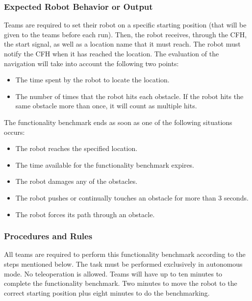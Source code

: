 \subsubsection{Expected Robot Behavior or Output}
\label{sssec:FooOMOutput}

Teams are required to set their robot on a specific starting position (that will be given to the teams before each run). Then, the robot receives, through the CFH, the start signal, as well as a location name that it must reach. The robot must notify the CFH when it has reached the location. The evaluation of the navigation will take into account the following two points:
\begin{itemize}
  \item The time spent by the robot to locate the location. 
  \item The number of times that the robot hits each obstacle. If the robot hits the same obstacle more than once, it will count as multiple hits.
\end{itemize}

The functionality benchmark ends as soon as one of the following situations occurs:
\begin{itemize}
  \item The robot reaches the specified location.
  \item The time available for the functionality benchmark expires.
  \item The robot damages any of the obstacles.
  \item The robot pushes or continually touches an obstacle for more than 3 seconds.
  \item The robot forces its path through an obstacle.
\end{itemize}

\subsubsection{Procedures and Rules}
\label{sssec:FooOMProcedures}
All teams are required to perform this functionality benchmark according to the steps mentioned below. The task must be performed exclusively in autonomous mode. No teleoperation is allowed. Teams will have up to ten minutes to complete the functionality benchmark. Two minutes to move the robot to the correct starting position plus eight minutes to do the benchmarking.

